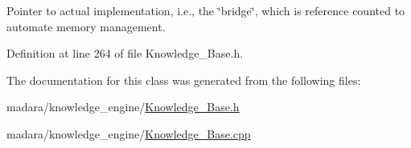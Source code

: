 Pointer to actual implementation, i.e., the \char`\"{}bridge\char`\"{}, which is reference counted to automate memory management. 



Definition at line 264 of file Knowledge\_\-Base.h.



The documentation for this class was generated from the following files:\begin{DoxyCompactItemize}
\item 
madara/knowledge\_\-engine/\hyperlink{Knowledge__Base_8h}{Knowledge\_\-Base.h}\item 
madara/knowledge\_\-engine/\hyperlink{Knowledge__Base_8cpp}{Knowledge\_\-Base.cpp}\end{DoxyCompactItemize}
